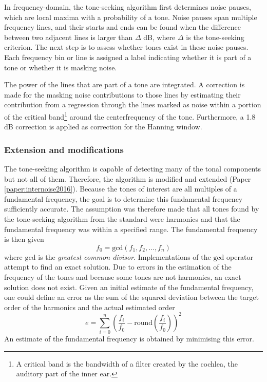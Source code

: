 In frequency-domain, the tone-seeking algorithm first determines noise pauses,
which are local maxima with a probability of a tone. Noise pauses span multiple
frequency lines, and their starts and ends can be found when the difference
between two adjacent lines is larger than $\Delta$ dB, where $\Delta$ is the
tone-seeking criterion. The next step is to assess whether tones exist in these
noise pauses. Each frequency bin or line is assigned a label indicating whether
it is part of a tone or whether it is masking noise.

The power of the lines that are part of a tone are integrated. A correction is
made for the masking noise contributions to those lines by estimating their
contribution from a regression through the lines marked as noise within a
portion of the critical band\footnote{A critical band is the bandwidth of a
filter created by the cochlea, the auditory part of the inner ear.} around the
centerfrequency of the tone. Furthermore, a 1.8 dB correction is applied as
correction for the Hanning window.

\subsubsection*{Extension and modifications}
The tone-seeking algorithm is capable of detecting many of the tonal components
but not all of them. Therefore, the algorithm is modified and extended (Paper \ref{paper:internoise2016}).
Because the tones of interest are all multiples of a
fundamental frequency, the goal is to determine this fundamental frequency
sufficiently accurate. The assumption was therefore made that all tones found by the
tone-seeking algorithm from the standard were harmonics and that the fundamental
frequency was within a specified range.
The fundamental frequency is then given
\begin{equation}
 f_{0} = \mathrm{gcd}\left(f_1, f_2, \dots, f_n \right)
\end{equation}
where $\mathrm{gcd}$ is the \emph{greatest common divisor}.
Implementations of the $\mathrm{gcd}$ operator attempt to find an exact solution.
Due to errors in the estimation of the frequency of the tones and because some tones are
not harmonics, an exact solution does not exist. Given an initial estimate of
the fundamental frequency, one could define an error as the sum of the squared
deviation between the target order of the harmonics and the actual estimated
order
\begin{equation}\label{eq:tool:features:error}
 e = \sum_{i=0}^{n} \left( \frac{f_i}{f_0} - \mathrm{round}\left(\frac{f_i}{f_0}\right) \right)^2
\end{equation}
An estimate of the fundamental frequency is obtained by minimising this error.

